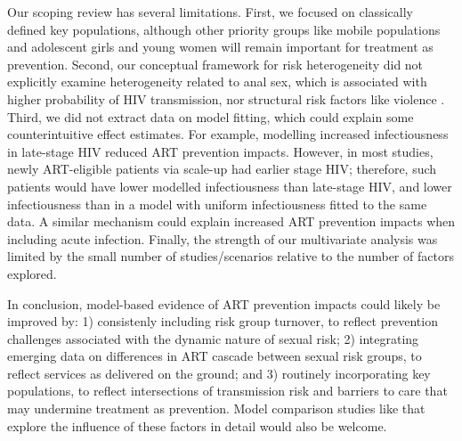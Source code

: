 \par
Our scoping review has several limitations.
First, we focused on classically defined key populations,
although other priority groups like mobile populations and adolescent girls and young women
will remain important for treatment as prevention.
Second, our conceptual framework for risk heterogeneity did not explicitly examine
heterogeneity related to anal sex, which is associated with higher probability of HIV transmission,
nor structural risk factors like violence \cite{Silverman2011,Baggaley2013}.
Third, we did not extract data on model fitting,
which could explain some counterintuitive effect estimates.
For example, modelling increased infectiousness in late-stage HIV reduced ART prevention impacts.
However, in most studies, newly ART-eligible patients via scale-up had earlier stage HIV;
therefore, such patients would have lower modelled infectiousness than late-stage HIV,
and lower infectiousness than in a model with uniform infectiousness fitted to the same data.
A similar mechanism could explain increased ART prevention impacts when including acute infection.
Finally, the strength of our multivariate analysis was limited by
the small number of studies/scenarios relative to the number of factors explored.
\par
In conclusion, model-based evidence of ART prevention impacts could likely be improved by:
1) consistenly including risk group turnover,
   to reflect prevention challenges associated with the dynamic nature of sexual risk;
2) integrating emerging data on differences in ART cascade between sexual risk groups,
   to reflect services as delivered on the ground; and
3) routinely incorporating key populations,
   to reflect intersections of transmission risk and barriers to care
   that may undermine treatment as prevention.
Model comparison studies like \cite{Dodd2010,Hontelez2013} that explore
the influence of these factors in detail would also be welcome.